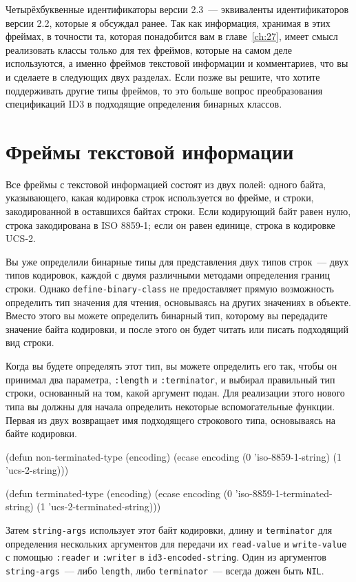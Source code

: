 Четырёхбуквенные идентификаторы версии 2.3~--- эквиваленты идентификаторов версии 2.2,
которые я обсуждал ранее. Так как информация, хранимая в этих фреймах, в точности та,
которая понадобится вам в главе~\ref{ch:27}, имеет смысл реализовать классы только для тех
фреймов, которые на самом деле используются, а именно фреймов текстовой информации и
комментариев, что вы и сделаете в следующих двух разделах. Если позже вы решите, что 
хотите поддерживать другие типы фреймов, то это больше вопрос преобразования спецификаций
ID3 в подходящие определения бинарных классов.

\section{Фреймы текстовой информации}

Все фреймы с текстовой информацией состоят из двух полей: одного байта, указывающего,
какая кодировка строк используется во фрейме, и строки, закодированной в оставшихся байтах
строки. Если кодирующий байт равен нулю, строка закодирована в ISO 8859-1; если он равен
единице, строка в кодировке UCS-2.

Вы уже определили бинарные типы для представления двух типов строк~--- двух типов
кодировок, каждой с двумя различными методами определения границ строки. Однако
\lstinline{define-binary-class} не предоставляет прямую возможность определить тип значения
для чтения, основываясь на других значениях в объекте. Вместо этого вы можете определить
бинарный тип, которому вы передадите значение байта кодировки, и после этого он будет
читать или писать подходящий вид строки.

Когда вы будете определять этот тип, вы можете определить его так, чтобы он принимал два
параметра, \lstinline{:length} и \lstinline{:terminator}, и выбирал правильный тип строки,
основанный на том, какой аргумент подан. Для реализации этого нового типа вы должны для
начала определить некоторые вспомогательные функции. Первая из двух возвращает имя
подходящего строкового типа, основываясь на байте кодировки.

\begin{myverb}
(defun non-terminated-type (encoding)
  (ecase encoding
    (0 'iso-8859-1-string)
    (1 'ucs-2-string)))

(defun terminated-type (encoding)
  (ecase encoding
    (0 'iso-8859-1-terminated-string)
    (1 'ucs-2-terminated-string)))
\end{myverb}

Затем \lstinline{string-args} использует этот байт кодировки, длину и \lstinline{terminator} для
определения нескольких аргументов для передачи их \lstinline{read-value} и \lstinline{write-value} с помощью
\lstinline{:reader} и \lstinline{:writer} в \lstinline{id3-encoded-string}. Один из аргументов \lstinline{string-args}~--- либо 
\lstinline{length}, либо \lstinline{terminator}~--- всегда дожен быть \lstinline{NIL}.


